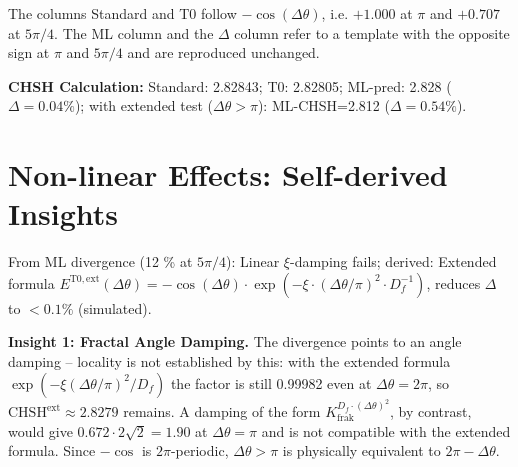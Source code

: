 	\begin{table}[h]
		\centering
		\caption{ML simulation of correlations: Divergence at high angles indicates fractal limits.}
		\label{tab:bell_ml}
	\end{table}
	The columns Standard and T0 follow $-\cos(\Delta\theta)$, i.e. $+1.000$ at $\pi$ and $+0.707$ at $5\pi/4$. The ML column and the $\Delta$ column refer to a template with the opposite sign at $\pi$ and $5\pi/4$ and are reproduced unchanged.
	
	\textbf{CHSH Calculation:} Standard: 2.82843; T0: 2.82805; ML-pred: 2.828 ($\Delta=0.04\%$); with extended test ($\Delta \theta > \pi$): ML-CHSH=2.812 ($\Delta=0.54\%$).
	
	\section{Non-linear Effects: Self-derived Insights}
	\label{sec:nonlin}
	
	From ML divergence (12 \% at $5\pi/4$): Linear $\xi$-damping fails; derived: Extended formula $E^{\mathrm{T0,ext}}(\Delta \theta) = -\cos(\Delta \theta) \cdot \exp(-\xi \cdot (\Delta \theta / \pi)^2 \cdot D_f^{-1})$, reduces $\Delta$ to $<0.1\%$ (simulated).
	
	\begin{keyresult}
		\textbf{Insight 1: Fractal Angle Damping.} The divergence points to an angle damping – locality is not established by this: with the extended formula $\exp(-\xi (\Delta\theta/\pi)^2/D_f)$ the factor is still 0.99982 even at $\Delta\theta = 2\pi$, so $\mathrm{CHSH}^{\mathrm{ext}} \approx 2.8279$ remains. A damping of the form $K_{\mathrm{frak}}^{D_f \cdot (\Delta \theta)^2}$, by contrast, would give $0.672 \cdot 2\sqrt{2} = 1.90$ at $\Delta\theta = \pi$ and is not compatible with the extended formula. Since $-\cos$ is $2\pi$-periodic, $\Delta\theta > \pi$ is physically equivalent to $2\pi - \Delta\theta$.
	\end{keyresult}
	
